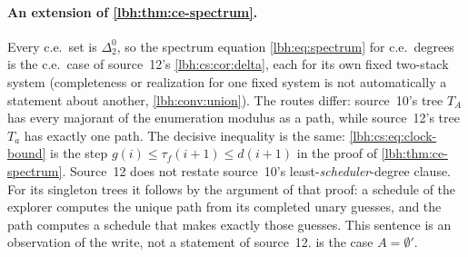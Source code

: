 \documentclass[11pt,letterpaper]{article}
\theoremstyle{definition}
\theoremstyle{remark}
\newcommand{\1}{\mathbf 1}
\begin{document}
\paragraph{An extension of \cref{lbh:thm:ce-spectrum}.} Every c.e.\ set is $\Delta^0_2$, so the
spectrum equation \eqref{lbh:eq:spectrum} for c.e.\ degrees is the c.e.\ case of source~12's
\cref{lbh:cs:cor:delta}, each for its own fixed two-stack system (completeness or realization for
one fixed system is not automatically a statement about another, \cref{lbh:conv:union}). The
routes differ: source~10's tree $T_A$ has every majorant of the enumeration modulus as a path, while
source~12's tree $T_a$ has exactly one path. The decisive inequality is the same:
\eqref{lbh:cs:eq:clock-bound} is the step $g(i)\le\tau_f(i+1)\le d(i+1)$ in the proof of
\cref{lbh:thm:ce-spectrum}. Source~12 does not restate source~10's least-\emph{scheduler}-degree
clause. For its singleton trees it follows by the argument of that proof: a schedule of the
explorer computes the unique path from its completed unary guesses, and the path computes a schedule
that makes exactly those guesses. This sentence is an observation of the write, not a statement of
source~12.  is the case $A=\emptyset'$.
\end{document}
